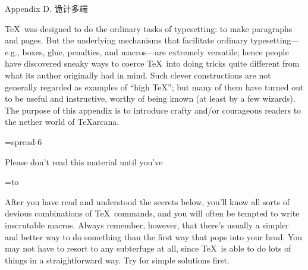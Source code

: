 


\beginappendix Appendix D. 诡计多端

\TeX\ was designed to do the ordinary tasks of typesetting: to make paragraphs
and pages. But the underlying mechanisms that facilitate ordinary
typesetting---e.g., boxes, glue, penalties, and macros---are extremely
versatile; hence people have discovered sneaky ways to coerce \TeX\ into
doing tricks quite different from what its author originally had in mind.
Such clever constructions are not generally regarded as examples of
``high \TeX''; but many of them have turned out to be useful and
instructive, worthy of being known (at least by a few wizards). The purpose
of this appendix is to introduce crafty and/or courageous readers
to the nether world of \TeX arcana.

\ninepoint\medskip
{}=\hbox spread-6\font %
 {\strut Please don't read this material until you've}
=\hbox to
\nointerlineskip
\noindent\strut After you have read and understood the secrets below, you'll
know all sorts of devious combinations of \TeX\ commands,
and you will often be tempted to write inscrutable macros. Always remember,
however, that there's usually a simpler and better way to do something
than the first way that pops into your head. You may not have to
resort to any subterfuge at all, since \TeX\ is able to do lots of things
in a straightforward way. Try for simple solutions first.

